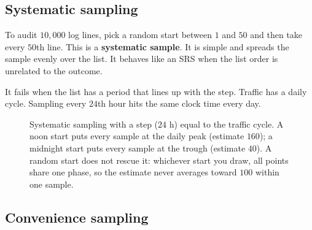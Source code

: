 \subsection{Systematic sampling}

To audit $10{,}000$ log lines, pick a random start between $1$ and $50$ and then take
every $50$th line. This is a \textbf{systematic sample}. It is simple and spreads the
sample evenly over the list. It behaves like an SRS when the list order is unrelated to
the outcome.

It fails when the list has a period that lines up with the step. Traffic has a daily
cycle. Sampling every $24$th hour hits the same clock time every day.

\begin{figure}[H]
\centering
{}
\caption{Systematic sampling with a step ($24$ h) equal to the traffic cycle. A noon
start puts every sample at the daily peak (estimate $160$); a midnight start puts every
sample at the trough (estimate $40$). A random start does not rescue it: whichever start
you draw, all points share one phase, so the estimate never averages toward $100$ within
one sample.}
\label{fig:sampling-systematic}
\end{figure}

\subsection{Convenience sampling}

